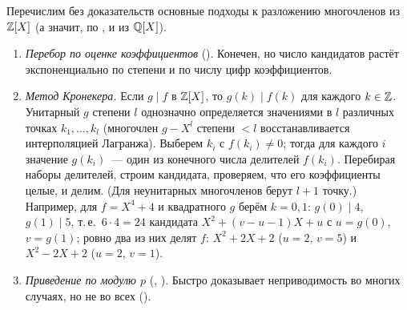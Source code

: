 \begin{aside}
Перечислим без доказательств основные подходы к разложению многочленов из $\mathbb Z[X]$ (а значит, по , и из
$\mathbb Q[X]$).
\begin{enumerate}[leftmargin=*,label=\arabic*.]
\item \emph{Перебор по оценке коэффициентов} (). Конечен, но число кандидатов растёт экспоненциально по степени
и по числу цифр коэффициентов.

\item \emph{Метод Кронекера.} Если $g\mid f$ в $\mathbb Z[X]$, то $g(k)\mid f(k)$ для каждого $k\in\mathbb Z$. Унитарный $g$ степени $l$
однозначно определяется значениями в $l$ различных точках $k_1,\dots,k_l$ (многочлен $g-X^l$ степени $<l$ восстанавливается
интерполяцией Лагранжа). Выберем $k_i$ с $f(k_i)\ne0$; тогда для каждого $i$ значение $g(k_i)$~--- один из конечного числа
делителей $f(k_i)$. Перебирая наборы делителей, строим кандидата, проверяем, что его коэффициенты целые, и делим.
(Для неунитарных многочленов берут $l+1$ точку.) Например, для $f=X^4+4$ и квадратного $g$ берём $k=0,1$: $g(0)\mid4$,
$g(1)\mid5$, т.\,е.\ $6\cdot4=24$ кандидата $X^2+(v-u-1)X+u$ с $u=g(0)$, $v=g(1)$; ровно два из них делят $f$:
$X^2+2X+2$ ($u=2$, $v=5$) и $X^2-2X+2$ ($u=2$, $v=1$).

\item \emph{Приведение по модулю $p$} (, ). Быстро доказывает неприводимость во многих случаях, но
не во всех ().


\end{enumerate}
\end{aside}
